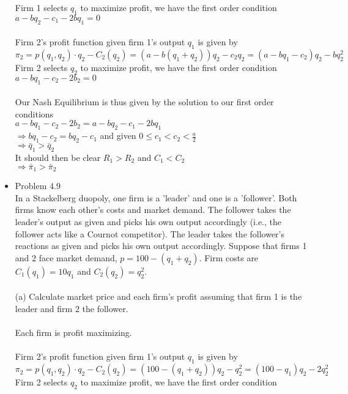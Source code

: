 \documentclass{article}
\begin{document}
\begin{itemize}
    Firm 1 selects $q_1$ to maximize profit, we have the first order condition\\
    $a-bq_2-c_1-2bq_1=0$\\\\
    Firm 2's profit function given firm 1's output $q_1$ is given by\\
    $\pi_2=p(q_1,q_2)\cdot q_2-C_2(q_2)=(a-b(q_1+q_2))q_2-c_2q_2=(a-bq_1-c_2)q_2-bq_2^2$\\
    Firm 2 selects $q_2$ to maximize profit, we have the first order condition\\
    $a-bq_1-c_2-2b_2=0$\\\\
    Our Nash Equilibrium is thus given by the solution to our first order conditions\\
    $a-bq_1-c_2-2b_2=a-bq_2-c_1-2bq_1$\\
    $\Rightarrow bq_1-c_2=bq_2-c_1$ and given $0\leq c_1<c_2<\frac{a}{2}$\\
    $\Rightarrow \bar{q}_1>\bar{q}_2$\\
    It should then be clear $R_1>R_2$ and $C_1<C_2$\\
    $\Rightarrow \bar{\pi}_1>\bar{\pi}_2$
    \pagebreak
    \item Problem 4.9\\
    In a Stackelberg duopoly, one firm is a 'leader' and one is a 'follower'.  Both firms know each other's costs and market demand.  The follower takes the leader's output as given and picks his own output accordingly (i.e., the follower acts like a Cournot competitor).  The leader takes the follower's reactions as given and picks his own output accordingly.  Suppose that firms 1 and 2 face market demand, $p=100-(q_1+q_2)$.  Firm costs are $C_1(q_1)=10q_1$ and $C_2(q_2)=q_2^2$.\\\\
    (a) Calculate market price and each firm's profit assuming that firm 1 is the leader and firm 2 the follower.\\\\
    Each firm is profit maximizing.\\\\
    Firm 2's profit function given firm 1's output $q_1$ is given by\\
    $\pi_2=p(q_1,q_2)\cdot q_2-C_2(q_2)=(100-(q_1+q_2))q_2-q_2^2=(100-q_1)q_2-2q_2^2$\\
    Firm 2 selects $q_2$ to maximize profit, we have the first order condition\\

\end{itemize}
\end{document}
